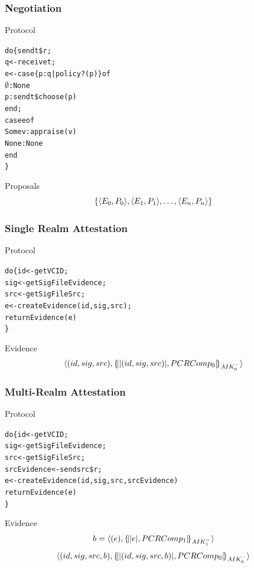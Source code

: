 \documentclass{beamer}
\begin{document}


\begin{frame}[fragile]
  \frametitle{Negotiation}

  \begin{block}{Protocol}
  \begin{alltt}
  do \{ send t \$ r;
       q <- receive t;
       e <- case \{p:q | policy?(p)\} of
              \(\emptyset\) : None
              p : send t \$ choose(p)
            end;
       case e of 
         Some v : appraise(v)
         None : None
       end
  \}
\end{alltt}
\end{block}

\begin{block}{Proposals}
  \[
  \{\langle E_0,P_0\rangle,\langle E_1,P_1\rangle,\ldots,\langle E_n,P_n\rangle\}
  \]
\end{block}

\end{frame}

\begin{frame}[fragile]
  \frametitle{Single Realm Attestation}

\begin{block}{Protocol}
\begin{alltt}
  do \{ id <- getVCID;
       sig <- getSigFileEvidence;
       src <- getSigFileSrc;
       e <- createEvidence(id,sig,src);
       returnEvidence(e)
  \}
\end{alltt}
\end{block}

\begin{block}{Evidence}
\[\langle (id,sig,src),\{\!\lvert \lvert (id,sig,src) \rvert,PCRComp_0\rvert\!\}_{AIK_0^{-}}\rangle\]
\end{block}

\end{frame}

\begin{frame}[fragile]
  \frametitle{Multi-Realm Attestation}

\begin{block}{Protocol}
\begin{alltt}
  do \{ id <- getVCID;
       sig <- getSigFileEvidence;
       src <- getSigFileSrc;
       srcEvidence <- send src \$ r;
       e <- createEvidence(id,sig,src,srcEvidence)
       returnEvidence(e)
  \}
\end{alltt}
\end{block}

\begin{block}{Evidence}
\[b=\langle (e),\{\!\lvert \lvert e \rvert,PCRComp_1\rvert\!\}_{AIK_1^{-}}\rangle\]
\[\langle (id,sig,src,b),\{\!\lvert \lvert (id,sig,src,b) \rvert,PCRComp_0\rvert\!\}_{AIK_0^{-}}\rangle\]
\end{block}

\end{frame}
\end{document}
